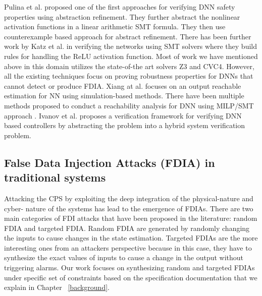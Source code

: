 Pulina et al.\cite{10.1007/978-3-642-14295-6_24} proposed one of the first approaches for verifying DNN safety properties using abstraction refinement. They further abstract \cite{article} the nonlinear activation functions in a linear arithmetic SMT formula. They then use counterexample based approach for abstract refinement. There has been further work by Katz et al.\cite{10.1007/978-3-319-63387-9_5} in verifying the networks using SMT solvers where they build rules for handling the ReLU activation function. Most of work we have mentioned above in this domain utilizes the state-of-the art solvers Z3 and CVC4. However, all the existing techniques focus on proving robustness properties \cite{NIPS2016_6339} for DNNs that cannot detect or produce FDIA. Xiang at al.\cite{xiang2017output} focuses on an output reachable estimation for NN using simulation-based methods. There have been multiple methods proposed to conduct a reachability analysis for DNN using MILP/SMT approach \cite{10.1145/3302504.3313351} \cite{ehlers2017formal} \cite{10.1007/978-3-319-63387-9_5} \cite{lomuscio2017approach} \cite{article}. Ivanov et al. \cite{ivanov2018verisig} proposes a verification framework for verifying DNN based controllers by abstracting the problem into a hybrid system verification problem.  


\subsection{False Data Injection Attacks (FDIA) in traditional systems}
Attacking the CPS by exploiting the deep integration of the physical-nature and cyber- nature of the systems has lead to the emergence of FDIAs. 
There are two main categories of FDI attacks that have been proposed in the literature: random FDIA and targeted FDIA. Random FDIA are generated by randomly changing the inputs to cause changes in the state estimation. Targeted FDIAs are the more interesting ones from an attackers perspective because in this case, they have to synthesize the exact values of inputs to cause a change in the output without triggering alarms. Our work focuses on synthesizing random and targeted FDIAs under specific set of constraints based on the specification documentation that we explain in Chapter ~\ref{background}. 

